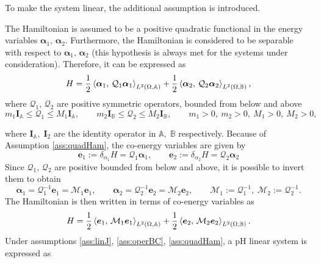 To make the system linear, the additional assumption is introduced.

\begin{assumption}\label{ass:quadHam}
	The Hamiltonian is assumed to be a positive quadratic functional in the energy variables $\bm{\alpha}_1, \, \bm{\alpha}_2$. Furthermore, the Hamiltonian is considered to be separable  with respect to $\bm{\alpha}_1, \, \bm{\alpha}_2$ (this hypothesis is always met for the systems under consideration). Therefore, it can be expressed as 
	\begin{equation}
		H = \frac{1}{2} \inner[L^2(\Omega, \mathbb{A})]{\bm{\alpha}_{1}}{\mathcal{Q}_1\bm{\alpha}_{1}} + \frac{1}{2} \inner[L^2(\Omega, \mathbb{B})]{\bm{\alpha}_{2}}{\mathcal{Q}_2\bm{\alpha}_{2}},
	\end{equation}
	where $\mathcal{Q}_1, \, \mathcal{Q}_2$ are positive symmetric operators, bounded from below and above
	\begin{equation*}
	m_1 \bm{I}_\mathbb{A} \le\mathcal{Q}_1 \le M_1 \bm{I}_\mathbb{A}, \qquad  m_2 \bm{I}_\mathbb{B} \le \mathcal{Q}_2 \le M_2 \bm{I}_\mathbb{B}, \qquad m_1>0, \ m_2>0, \ M_1>0, \ M_2>0,
	\end{equation*} 
\end{assumption}
where $\bm{I}_\mathbb{A}, \; \bm{I}_2$ are the identity operator in $\mathbb{A}, \; \mathbb{B}$ respectively. 
Because of Assumption \ref{ass:quadHam}, the co-energy variables are given by 
\begin{equation}\label{eq:e_lin}
	\bm{e}_1 := \delta_{\alpha_1} H = \mathcal{Q}_1 \bm{\alpha}_1, \qquad \bm{e}_2 := \delta_{\alpha_2} H = \mathcal{Q}_2 \bm{\alpha}_2
\end{equation}
Since $\mathcal{Q}_1, \, \mathcal{Q}_2$ are positive bounded from below and above, it is possible to invert them to obtain
\begin{equation}\label{eq:alpha_lin}
\bm{\alpha}_1 = \mathcal{Q}_1^{-1}\bm{e}_1 = \mathcal{M}_1\bm{e}_1, \qquad  \bm{\alpha}_2 = \mathcal{Q}_2^{-1} \bm{e}_2 = \mathcal{M}_2 \bm{e}_2, \qquad \mathcal{M}_1 := \mathcal{Q}_1^{-1}, \; \mathcal{M}_2 := \mathcal{Q}_2^{-1}.
\end{equation}
The Hamiltonian is then written in terms of co-energy variables as 
\begin{equation}\label{eq:H_coenergy}
H = \frac{1}{2} \inner[L^2(\Omega, \mathbb{A})]{\bm{e}_{1}}{\mathcal{M}_1\bm{e}_{1}} + \frac{1}{2} \inner[L^2(\Omega, \mathbb{B})]{\bm{e}_{2}}{\mathcal{M}_2\bm{e}_{2}}.
\end{equation}
Under assumptions \ref{ass:linJ}, \ref{ass:operBC}, \ref{ass:quadHam}, a pH linear system is expressed as 

